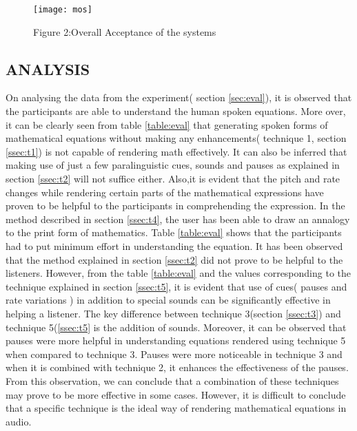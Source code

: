 \documentclass{article}
\begin{document}
\begin{figure}[h]
\label{fig:mos}

\begin{minipage}[b]{1.0\linewidth}
  \centering
  \centerline{\texttt{[image: mos]}}
  \centerline{ Figure 2:Overall Acceptance of the systems}\medskip
\end{minipage}
\end{figure}



\subsection{ANALYSIS}
\label{ssec:analysis}
On analysing the data from the experiment( section \ref{sec:eval}), it is observed that the participants are able to understand the human spoken equations. More over, it can be clearly seen from table \ref{table:eval} that generating spoken forms of mathematical equations without making any enhancements( technique 1, section \ref{ssec:t1}) is not capable of rendering math effectively. It can also be inferred that making use of just  a few paralinguistic cues, sounds and pauses as explained in section \ref{ssec:t2} will not suffice either. Also,it is evident that the pitch and rate changes while rendering certain parts of the mathematical expressions have proven to be helpful to the participants in comprehending the expression. In the method described in section \ref{ssec:t4}, the user has been able to draw an annalogy to the print form of mathematics. Table \ref{table:eval} shows that the participants had to put minimum effort in understanding the equation. It has been observed that the method explained in section \ref{ssec:t2} did not prove to be helpful to the listeners. However, from the table \ref{table:eval} and the values corresponding to the technique explained in section \ref{ssec:t5}, it is evident that use of  cues( pauses and rate variations ) in addition to special sounds can be significantly effective in helping a listener. The key difference between technique 3(section \ref{ssec:t3}) and technique 5(\ref{ssec:t5} is the addition of sounds. Moreover, it can be observed that pauses were more helpful in understanding equations rendered using technique 5 when compared to technique 3. Pauses were more noticeable in technique 3 and when it is combined with technique 2, it enhances the effectiveness of the pauses. From this observation, we can conclude that a combination of these techniques may prove to be more effective in some cases. However, it is difficult to conclude that a specific technique is the ideal way of rendering mathematical equations in audio. 
\end{document}
